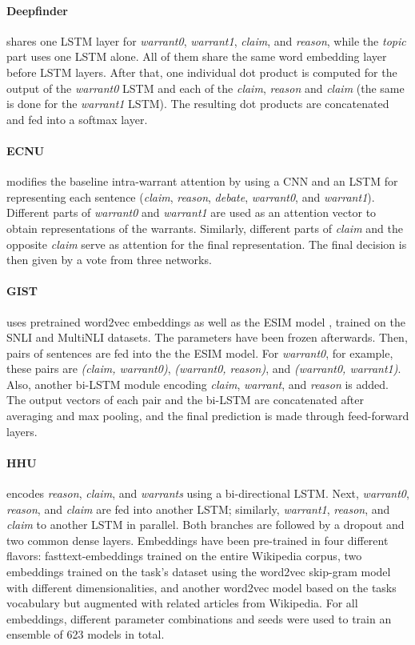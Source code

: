 \paragraph{Deepfinder}
shares one LSTM layer for \emph{warrant0}, \emph{warrant1}, \emph{claim}, and \emph{reason}, while the \emph{topic} part uses one LSTM alone. All of them share the same word embedding layer before LSTM layers. After that, one individual dot product is computed for the output of the \emph{warrant0} LSTM and each of the \emph{claim}, \emph{reason} and \emph{claim} (the same is done for the \emph{warrant1} LSTM). The resulting dot products are concatenated and fed into a softmax layer.


\paragraph{ECNU}
modifies the baseline intra-warrant attention \cite{Habernal.et.al.2018.NAACL.arct} by using a CNN and an LSTM for representing each sentence (\emph{claim}, \emph{reason}, \emph{debate}, \emph{warrant0}, and \emph{warrant1}). Different parts of \emph{warrant0} and \emph{warrant1} are used as an attention vector to obtain representations of the warrants. Similarly, different parts of \emph{claim} and the opposite \emph{claim} serve as attention for the final representation. The final decision is then given by a vote from three networks.


\paragraph{GIST} uses pretrained word2vec embeddings as well as the ESIM model \cite{Chen.et.al.2017.ACL.ESIM}, trained on the SNLI \cite{Bowman.et.al.2015} and MultiNLI \cite{nangia-EtAl:2017:RepEval} datasets. The parameters have been frozen afterwards. Then, pairs of sentences are fed into the the ESIM model. For \emph{warrant0}, for example, these pairs are \emph{(claim, warrant0)}, \emph{(warrant0, reason)}, and \emph{(warrant0, warrant1)}. Also, another bi-LSTM module encoding \emph{claim}, \emph{warrant}, and \emph{reason} is added. The output vectors of each pair and the bi-LSTM are concatenated after averaging and max pooling, and the final prediction is made through feed-forward layers.


\paragraph{HHU}
encodes \emph{reason}, \emph{claim}, and \emph{warrants} using a bi-directional LSTM. Next, \emph{warrant0}, \emph{reason}, and \emph{claim} are fed into another LSTM; similarly, \emph{warrant1}, \emph{reason}, and \emph{claim} to another LSTM in parallel. Both branches are followed by a dropout and two common dense layers. Embeddings have been pre-trained in four different flavors: fasttext-embeddings trained on the entire Wikipedia corpus, two embeddings trained on the task's dataset using the word2vec skip-gram model with different dimensionalities, and another word2vec model based on the tasks vocabulary but augmented with related articles from Wikipedia. For all embeddings, different parameter combinations and seeds were used to train an ensemble of 623 models in total.


